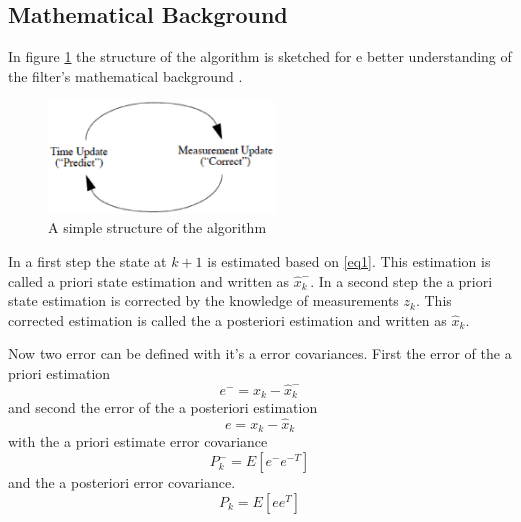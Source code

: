\subsection*{Mathematical Background}\label{math_kalman}
In figure \ref{simple_schematic} the structure of the algorithm is sketched for e better understanding of the filter's mathematical background . 
\begin{figure}[h]
\begin{center}
\includegraphics[width=6cm]{pictures/simple_schematic_algo.eps}
\caption{A simple structure of the algorithm}
\label{simple_schematic}
\end{center}
\end{figure}
In a first step the state at $k+1$ is estimated based on \ref{eq1}. This estimation is called a priori state estimation and written as $\hat{x}_k^{-}$. In a second step the a priori state estimation is corrected by the knowledge of measurements $z_k$. This corrected estimation is called the a posteriori estimation and written as $\hat{x}_k$.

Now two error can be defined with it's a error covariances. First the error of the a priori estimation 
\begin{equation}
e^{-}=x_k-\hat{x}_k^{-}
\end{equation}
and second the error of the a posteriori estimation 
\begin{equation}
e=x_k-\hat{x}_k
\end{equation}
with the a priori estimate error covariance 
\begin{equation}
P^{-}_k=E[e^{-}e^{-T}]
\end{equation}
and the a posteriori error covariance.
\begin{equation}
P_k=E[ee^{T}]\label{P_post}
\end{equation}

